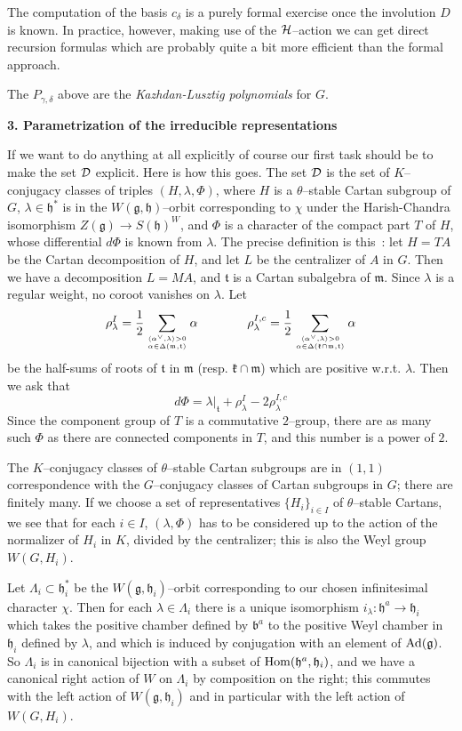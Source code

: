 \documentclass[11 pt]{article}
\def\ra{\rightarrow}
\def\a{\alpha}
\def\ac{\alpha^\vee}
\def\b{{\mathfrak b}}
\def\D{{\cal D}}
\def\d{\delta}
\def\F{\Phi}
\def\g{\gamma}
\def\gf{{\mathfrak g}}
\def\Hc{{\cal H}}
\def\Hom{{\rm Hom}}
\def\hf{{\mathfrak h}}
\def\kf{{\mathfrak k}}
\def\L{\Lambda}
\def\l{\lambda}
\def\mf{{\mathfrak m}}
\def\t{\theta}
\def\tf{{\mathfrak t}}
\begin{document}
The computation of the basis $c_\d$ is a purely formal exercise once the
involution $D$ is known. In practice, however, making use of the $\Hc$--action
we can get direct recursion formulas which are probably quite a bit more 
efficient than the formal approach.

The $P_{\g,\d}$ above are the \textit{Kazhdan-Lusztig polynomials} for $G$.

\bigskip

\noindent\textbf{3. Parametrization of the irreducible representations}

\medskip

If we want to do anything at all explicitly of course our first task should be
to make the set $\D$ explicit. Here is how this goes. The set $\D$ is the
set of $K$--conjugacy classes of triples $(H,\l,\F)$, where $H$ is a 
$\t$--stable Cartan subgroup of $G$, $\l\in\hf^*$ is in the $W(\gf,\hf)$--orbit
corresponding to $\chi$ under the Harish-Chandra isomorphism 
$Z(\gf)\ra S(\hf)^W$, and $\F$ is
a character of the compact part $T$ of $H$, whose differential $d\F$ is
known from $\l$. The precise definition is this~: let $H=TA$ be the Cartan
decomposition of $H$, and let $L$ be the centralizer of $A$ in $G$. Then
we have a decomposition $L=MA$, and $\tf$ is a Cartan subalgebra of $\mf$.
Since $\l$ is a regular weight, no coroot vanishes on $\l$. Let
$$
\rho^I_\l=\frac{1}{2}\sum_{\langle\ac,\l\rangle>0\atop\a\in\Delta(\mf,\tf)}\a
\qquad\qquad
\rho^{I,c}_\l=\frac{1}{2}\sum_{\langle\ac,\l\rangle>0\atop\a\in
\Delta(\kf\cap\mf,\tf)}\a
$$
be the half-sums of roots of $\tf$ in $\mf$ (resp. $\kf\cap\mf$) which are
positive w.r.t. $\l$. Then we ask that
$$
d\F=\l|_\tf+\rho^I_\l-2\rho^{I,c}_\l
$$
Since the component group of $T$ is a commutative $2$--group, there are as many
such $\F$ as there are connected components in $T$, and this number is a power
of $2$.

The $K$--conjugacy classes of $\t$--stable Cartan subgroups are in $(1,1)$
correspondence with the $G$--conjugacy classes of Cartan subgroups in $G$;
there are finitely many. If we choose a set of representatives 
$\{H_i\}_{i\in I}$ of $\t$--stable Cartans, we see that for each $i\in I$,
$(\l,\F)$ has to be considered up to the action of the normalizer of $H_i$
in $K$, divided by the centralizer; this is also the Weyl group $W(G,H_i)$.

Let $\L_i\subset\hf_i^*$ be the $W(\gf,\hf_i)$--orbit corresponding to our 
chosen infinitesimal character $\chi$. Then for each $\l\in\L_i$ there is a 
unique isomorphism $i_\l:\hf^a\ra\hf_i$ which takes the positive chamber
defined by $\b^a$ to the positive Weyl chamber in $\hf_i$ defined by $\l$,
and which is induced by conjugation with an element of ${\rm Ad}(\gf)$. So
$\L_i$ is in canonical bijection with a subset of $\Hom(\hf^a,\hf_i)$, and
we have a canonical right action of $W$ on $\L_i$ by composition on the right;
this commutes with the left action of $W(\gf,\hf_i)$ and in particular with
the left action of $W(G,H_i)$. 
\end{document}
